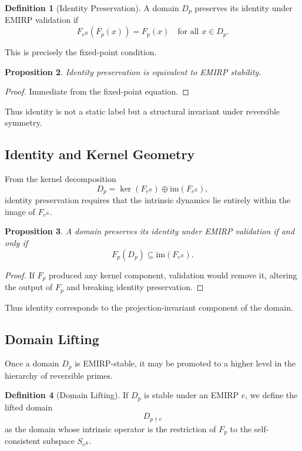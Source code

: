 \documentclass[11pt]{article}
\theoremstyle{definition}
\newtheorem{definition}{Definition}[section]
\theoremstyle{plain}
\newtheorem{proposition}[definition]{Proposition}
\theoremstyle{remark}
\begin{document}
\begin{definition}[Identity Preservation]
A domain $D_p$ preserves its identity under EMIRP validation if
\[
F_{e^R}(F_p(x)) = F_p(x)
\quad \text{for all } x \in D_p.
\]
\end{definition}

This is precisely the fixed-point condition.

\begin{proposition}
Identity preservation is equivalent to EMIRP stability.
\end{proposition}

\begin{proof}
Immediate from the fixed-point equation.
\end{proof}

Thus identity is not a static label but a structural invariant under
reversible symmetry.

\subsection{Identity and Kernel Geometry}

From the kernel decomposition
\[
D_p = \ker(F_{e^R}) \oplus \mathrm{im}(F_{e^R}),
\]
identity preservation requires that the intrinsic dynamics lie entirely
within the image of $F_{e^R}$.

\begin{proposition}
A domain preserves its identity under EMIRP validation if and only if
\[
F_p(D_p) \subseteq \mathrm{im}(F_{e^R}).
\]
\end{proposition}

\begin{proof}
If $F_p$ produced any kernel component, validation would remove it,
altering the output of $F_p$ and breaking identity preservation.
\end{proof}

Thus identity corresponds to the projection-invariant component of the
domain.

\subsection{Domain Lifting}

Once a domain $D_p$ is EMIRP-stable, it may be promoted to a higher
level in the hierarchy of reversible primes.

\begin{definition}[Domain Lifting]
If $D_p$ is stable under an EMIRP $e$, we define the lifted domain
\[
D_{p \uparrow e}
\]
as the domain whose intrinsic operator is the restriction of $F_p$ to
the self-consistent subspace $S_{e^R}$.
\end{definition}
\end{document}
